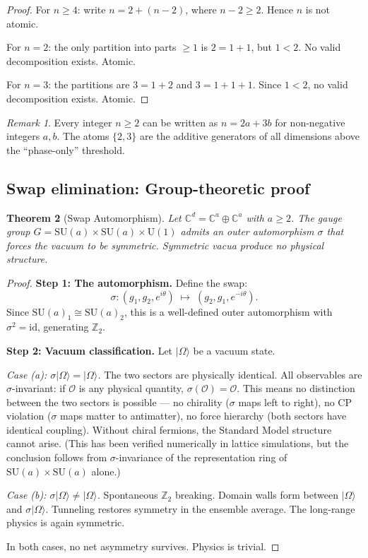 \documentclass[12pt]{article}
\newtheorem{theorem}{Theorem}[section]
\theoremstyle{remark}
\newtheorem{remark}[theorem]{Remark}
\theoremstyle{definition}
\newcommand{\CC}{\mathbb{C}}
\begin{document}
\begin{proof}
For $n \geq 4$: write $n = 2 + (n - 2)$, where $n - 2 \geq 2$. Hence $n$ is not atomic.

For $n = 2$: the only partition into parts $\geq 1$ is $2 = 1 + 1$, but $1 < 2$. No valid decomposition exists. Atomic.

For $n = 3$: the partitions are $3 = 1 + 2$ and $3 = 1 + 1 + 1$. Since $1 < 2$, no valid decomposition exists. Atomic.
\end{proof}

\begin{remark}
Every integer $n \geq 2$ can be written as $n = 2a + 3b$ for non-negative integers $a, b$. The atoms $\{2, 3\}$ are the additive generators of all dimensions above the ``phase-only'' threshold.
\end{remark}

\subsection{Swap elimination: Group-theoretic proof}

\begin{theorem}[Swap Automorphism]
\label{thm:swap}
Let $\CC^d = \CC^a \oplus \CC^a$ with $a \geq 2$. The gauge group $G = \text{SU}(a) \times \text{SU}(a) \times \text{U}(1)$ admits an outer automorphism $\sigma$ that forces the vacuum to be symmetric. Symmetric vacua produce no physical structure.
\end{theorem}

\begin{proof}
\textbf{Step 1: The automorphism.}
Define the swap:
\begin{equation}
\sigma: (g_1, g_2, e^{i\theta}) \;\mapsto\; (g_2, g_1, e^{-i\theta}).
\end{equation}
Since $\text{SU}(a)_1 \cong \text{SU}(a)_2$, this is a well-defined outer automorphism with $\sigma^2 = \text{id}$, generating $\mathbb{Z}_2$.

\textbf{Step 2: Vacuum classification.}
Let $|\Omega\rangle$ be a vacuum state.

\emph{Case (a): $\sigma|\Omega\rangle = |\Omega\rangle$.}
The two sectors are physically identical. All observables are $\sigma$-invariant: if $\mathcal{O}$ is any physical quantity, $\sigma(\mathcal{O}) = \mathcal{O}$. This means no distinction between the two sectors is possible --- no chirality ($\sigma$ maps left to right), no CP violation ($\sigma$ maps matter to antimatter), no force hierarchy (both sectors have identical coupling). Without chiral fermions, the Standard Model structure cannot arise. (This has been verified numerically in lattice simulations, but the conclusion follows from $\sigma$-invariance of the representation ring of $\text{SU}(a) \times \text{SU}(a)$ alone.)

\emph{Case (b): $\sigma|\Omega\rangle \neq |\Omega\rangle$.}
Spontaneous $\mathbb{Z}_2$ breaking. Domain walls form between $|\Omega\rangle$ and $\sigma|\Omega\rangle$. Tunneling restores symmetry in the ensemble average. The long-range physics is again symmetric.

In both cases, no net asymmetry survives. Physics is trivial.
\end{proof}
\end{document}
